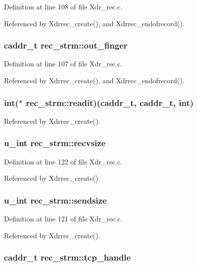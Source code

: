 Definition at line 108 of file Xdr\_\-rec.c.

Referenced by Xdrrec\_\-create(), and Xdrrec\_\-endofrecord().
\subsubsection{\setlength{\rightskip}{0pt plus 5cm}caddr\_\-t {\bf rec\_\-strm::out\_\-finger}}\label{structrec__strm_o4}




Definition at line 107 of file Xdr\_\-rec.c.

Referenced by Xdrrec\_\-create(), and Xdrrec\_\-endofrecord().
\subsubsection{\setlength{\rightskip}{0pt plus 5cm}int($\ast$ {\bf rec\_\-strm::readit})(caddr\_\-t, caddr\_\-t, int)}\label{structrec__strm_o8}




Referenced by Xdrrec\_\-create().
\subsubsection{\setlength{\rightskip}{0pt plus 5cm}u\_\-int {\bf rec\_\-strm::recvsize}}\label{structrec__strm_o16}




Definition at line 122 of file Xdr\_\-rec.c.

Referenced by Xdrrec\_\-create().
\subsubsection{\setlength{\rightskip}{0pt plus 5cm}u\_\-int {\bf rec\_\-strm::sendsize}}\label{structrec__strm_o15}




Definition at line 121 of file Xdr\_\-rec.c.

Referenced by Xdrrec\_\-create().
\subsubsection{\setlength{\rightskip}{0pt plus 5cm}caddr\_\-t {\bf rec\_\-strm::tcp\_\-handle}}\label{structrec__strm_o0}




